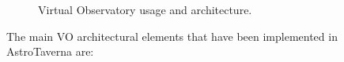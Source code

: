 \documentclass{aa}
\begin{document}
\begin{figure}[tb]
\centering
\caption{Virtual Observatory usage and architecture.}
\label{fig:VOArch}
\end{figure}

The main VO architectural elements that have been implemented in AstroTaverna are:
\end{document}
